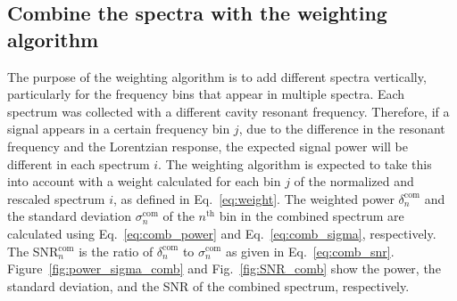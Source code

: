 


\subsection{Combine the spectra with the weighting algorithm} 
\label{sec:weighting_algorithm}

The purpose of the weighting algorithm is to add different spectra vertically,
 particularly for the frequency bins that appear in multiple spectra.  
Each spectrum was collected with a different cavity resonant frequency. 
Therefore, if a signal appears in a certain frequency bin $j$, due to the
 difference in the resonant frequency and the Lorentzian response, the 
expected signal
 power will be different in each spectrum $i$. The weighting algorithm is 
expected to take this into account with a weight calculated for each bin $j$ of
 the normalized and rescaled spectrum $i$, as defined in Eq.~\eqref{eq:weight}.
The weighted power $\delta^\text{com}_{n}$ and the standard deviation 
$\sigma^\text{com}_{n}$ of the $n^\text{th}$ bin in the combined spectrum are 
calculated using Eq.~\eqref{eq:comb_power} and Eq.~\eqref{eq:comb_sigma}, 
respectively. The SNR$^\text{com}_{n}$ is the ratio of 
$\delta^\text{com}_{n}$ to 
$\sigma^\text{com}_{n}$ as given in Eq.~\eqref{eq:comb_snr}. 
Figure~\ref{fig:power_sigma_comb} and Fig.~\ref{fig:SNR_comb} show the power, 
the standard deviation, and the SNR of the combined spectrum, respectively.


